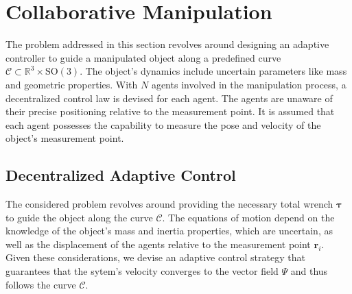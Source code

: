 \section{Collaborative Manipulation}

The problem addressed in this section revolves around designing an adaptive controller to guide a manipulated object along a predefined curve $\mathcal{C} \subset \mathbb{R}^3\times \text{SO}(3)$. The object's dynamics include uncertain parameters like mass and geometric properties. With $N$ agents involved in the manipulation process, a decentralized control law is devised for each agent. The agents are unaware of their precise positioning relative to the measurement point. It is assumed that each agent possesses the capability to measure the pose and velocity of the object's measurement point.
\subsection{Decentralized Adaptive Control}
The considered problem revolves around providing the necessary total wrench $\boldsymbol{\tau}$ to guide the object along the curve $\mathcal{C}$. The equations of motion depend on the knowledge of the object's mass and inertia properties, which are uncertain, as well as the displacement of the agents relative to the measurement point $\mathbf{r}_i$. Given these considerations, we devise an adaptive control strategy that guarantees that the sytem's velocity converges to the vector field $\Psi$ and thus follows the curve $\mathcal{C}$.

